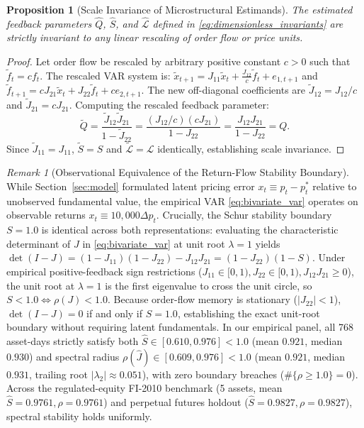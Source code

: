 \documentclass[12pt]{article}
\newtheorem{proposition}[theorem]{Proposition}
\theoremstyle{definition}
\theoremstyle{remark}
\newtheorem{remark}[theorem]{Remark}
\begin{document}
\begin{proposition}[Scale Invariance of Microstructural Estimands]
The estimated feedback parameters $\hat{Q}$, $\hat{S}$, and $\hat{\mathcal{L}}$ defined in \eqref{eq:dimensionless_invariants} are strictly invariant to any linear rescaling of order flow or price units.
\end{proposition}

\begin{proof}
Let order flow be rescaled by arbitrary positive constant $c > 0$ such that $\tilde{f}_t = c f_t$. The rescaled VAR system is:
$\tilde{x}_{t+1} = J_{11} \tilde{x}_t + \frac{J_{12}}{c} \tilde{f}_t + e_{1, t+1}$ and $\tilde{f}_{t+1} = c J_{21} \tilde{x}_t + J_{22} \tilde{f}_t + c e_{2, t+1}$.
The new off-diagonal coefficients are $\tilde{J}_{12} = J_{12} / c$ and $\tilde{J}_{21} = c J_{21}$.
Computing the rescaled feedback parameter:
\begin{equation}
\tilde{Q} = \frac{\tilde{J}_{12} \tilde{J}_{21}}{1 - \tilde{J}_{22}} = \frac{(J_{12} / c) (c J_{21})}{1 - J_{22}} = \frac{J_{12} J_{21}}{1 - J_{22}} = Q.
\end{equation}
Since $\tilde{J}_{11} = J_{11}$, $\tilde{S} = S$ and $\tilde{\mathcal{L}} = \mathcal{L}$ identically, establishing scale invariance.
\end{proof}

\begin{remark}[Observational Equivalence of the Return-Flow Stability Boundary]
While Section~\ref{sec:model} formulated latent pricing error $x_t \equiv p_t - p_t^*$ relative to unobserved fundamental value, the empirical VAR \eqref{eq:bivariate_var} operates on observable returns $x_t \equiv 10{,}000 \Delta p_t$. Crucially, the Schur stability boundary $S = 1.0$ is identical across both representations: evaluating the characteristic determinant of $J$ in \eqref{eq:bivariate_var} at unit root $\lambda = 1$ yields $\det(I - J) = (1 - J_{11})(1 - J_{22}) - J_{12} J_{21} = (1 - J_{22})(1 - S)$. Under empirical positive-feedback sign restrictions ($J_{11} \in [0, 1), J_{22} \in [0, 1), J_{12} J_{21} \ge 0$), the unit root at $\lambda = 1$ is the first eigenvalue to cross the unit circle, so $S < 1.0 \iff \rho(J) < 1.0$. Because order-flow memory is stationary ($|J_{22}| < 1$), $\det(I - J) = 0$ if and only if $S = 1.0$, establishing the exact unit-root boundary without requiring latent fundamentals. In our empirical panel, all 768 asset-days strictly satisfy both $\hat{S} \in [0.610, 0.976] < 1.0$ (mean $0.921$, median $0.930$) and spectral radius $\rho(\hat{J}) \in [0.609, 0.976] < 1.0$ (mean $0.921$, median $0.931$, trailing root $|\lambda_2| \approx 0.051$), with zero boundary breaches ($\#\{\rho \ge 1.0\} = 0$). Across the regulated-equity FI-2010 benchmark (5 assets, mean $\hat{S} = 0.9761, \rho = 0.9761$) and perpetual futures holdout ($\hat{S} = 0.9827, \rho = 0.9827$), spectral stability holds uniformly.
\end{remark}
\end{document}
